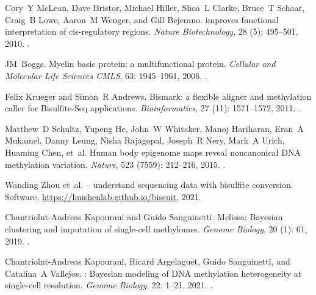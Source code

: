 \documentclass[10pt]{article}
\begin{document}
\begin{thebibliography}{31}
	Cory~Y McLean, Dave Bristor, Michael Hiller, Shoa~L Clarke, Bruce~T Schaar,
	Craig~B Lowe, Aaron~M Wenger, and Gill Bejerano.
	 improves functional interpretation of cis-regulatory regions.
	\newblock \emph{Nature Biotechnology}, 28 (5): 495--501,
	2010.
	\newblock {}.
	
	JM~Boggs.
	\newblock Myelin basic protein: a multifunctional protein.
	\newblock \emph{Cellular and Molecular Life Sciences CMLS}, 63:
	1945--1961, 2006.
	\newblock {}.
	
	Felix Krueger and Simon~R Andrews.
	\newblock Bismark: a flexible aligner and methylation caller for
	{Bisulfite-Seq} applications.
	\newblock \emph{Bioinformatics}, 27 (11): 1571--1572, 2011.
	\newblock {}.
	
	Matthew~D Schultz, Yupeng He, John~W Whitaker, Manoj Hariharan, Eran~A Mukamel,
	Danny Leung, Nisha Rajagopal, Joseph~R Nery, Mark~A Urich, Huaming Chen,
	et~al.
	\newblock Human body epigenome maps reveal noncanonical {DNA} methylation
	variation.
	\newblock \emph{Nature}, 523 (7559): 212--216, 2015.
	\newblock {}.
	
	Wanding Zhou et~al.
	 -- understand sequencing data with bisulfite conversion.
	\newblock Software, \url{https://huishenlab.github.io/biscuit}, 2021.
	
	Chantriolnt-Andreas Kapourani and Guido Sanguinetti.
	\newblock Melissa: Bayesian clustering and imputation of single-cell
	methylomes.
	\newblock \emph{Genome Biology}, 20 (1): 61, 2019.
	\newblock {}.
	
	Chantriolnt-Andreas Kapourani, Ricard Argelaguet, Guido Sanguinetti, and
	Catalina~A Vallejos.
	: Bayesian modeling of {DNA} methylation heterogeneity at
	single-cell resolution.
	\newblock \emph{Genome Biology}, 22: 1--21, 2021.
	\newblock {}.
	

\end{thebibliography}
\end{document}
